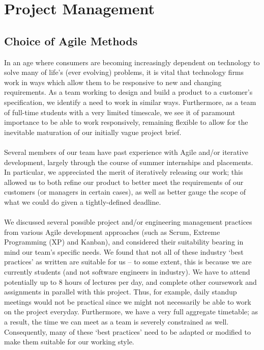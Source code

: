 \documentclass[a4paper, 10pt]{report}
\begin{document}
\chapter{Project Management}
\section{Choice of Agile Methods}
In an age where consumers are becoming increasingly dependent on technology to solve many of life's (ever evolving) problems, it is vital that technology firms work in ways which allow them to be responsive to new and changing requirements. As a team working to design and build a product to a customer's specification, we identify a need to work in similar ways. Furthermore, as a team of full-time students with a very limited timescale, we see it of paramount importance to be able to work responsively, remaining flexible to allow for the inevitable maturation of our initially vague project brief.\\\\
Several members of our team have past experience with Agile and/or iterative development, largely through the course of summer internships and placements. In particular, we appreciated the merit of iteratively releasing our work; this allowed us to both refine our product to better meet the requirements of our customers (or managers in certain cases), as well as better gauge the scope of what we could do given a tightly-defined deadline.\\\\
We discussed several possible project and/or engineering management practices from various Agile development approaches (such as Scrum, Extreme Programming (XP) and Kanban), and considered their suitability bearing in mind our team's specific needs. We found that not all of these industry `best practices' as written are suitable for us -- to some extent, this is because we are currently students (and not software engineers in industry). We have to attend potentially up to 8 hours of lectures per day, and complete other coursework and assignments in parallel with this project. Thus, for example, daily standup meetings would not be practical since we might not necessarily be able to work on the project everyday. Furthermore, we have a very full aggregate timetable; as a result, the time we can meet as a team is severely constrained as well. Consequently, many of these `best practices' need to be adapted or modified to make them suitable for our working style.\\\\
\end{document}
